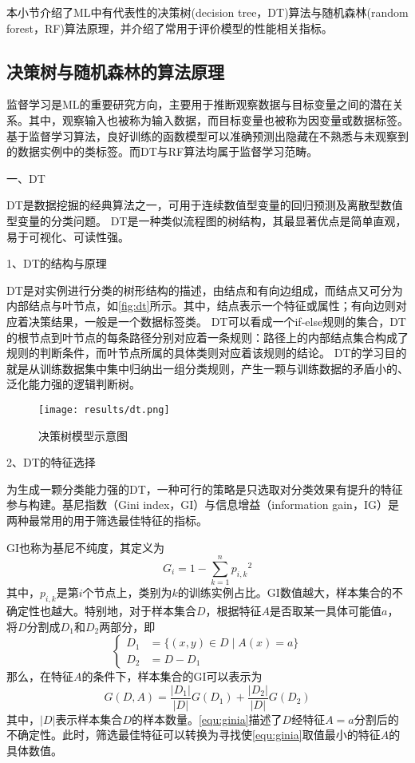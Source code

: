 本小节介绍了ML中有代表性的决策树(decision tree，DT)算法与随机森林(random forest，RF)算法原理，并介绍了常用于评价模型的性能相关指标。

\subsection{决策树与随机森林的算法原理}
监督学习是ML的重要研究方向，主要用于推断观察数据与目标变量之间的潜在关系。其中，观察输入也被称为输入数据，而目标变量也被称为因变量或数据标签。
基于监督学习算法，良好训练的函数模型可以准确预测出隐藏在不熟悉与未观察到的数据实例中的类标签。而DT与RF算法均属于监督学习范畴。

一、DT

DT是数据挖掘的经典算法之一，可用于连续数值型变量的回归预测及离散型数值型变量的分类问题\cite{Li2017,Liu2018}。
DT是一种类似流程图的树结构，其最显著优点是简单直观，易于可视化、可读性强。

1、DT的结构与原理

DT是对实例进行分类的树形结构的描述，由结点和有向边组成，而结点又可分为内部结点与叶节点，如\autoref{fig:dt}所示。其中，结点表示一个特征或属性；有向边则对应着决策结果，一般是一个数据标签类\cite{Li2017,Zhou2016}。
DT可以看成一个if-else规则的集合，DT的根节点到叶节点的每条路径分别对应着一条规则：路径上的内部结点集合构成了规则的判断条件，而叶节点所属的具体类则对应着该规则的结论。
DT的学习目的就是从训练数据集中集中归纳出一组分类规则，产生一颗与训练数据的矛盾小的、泛化能力强的逻辑判断树。
\begin{figure}[htbp]
    \centering
    \texttt{[image: results/dt.png]}
    \caption{\label{fig:dt}决策树模型示意图}
\end{figure}

2、DT的特征选择

为生成一颗分类能力强的DT，一种可行的策略是只选取对分类效果有提升的特征参与构建。基尼指数（Gini index，GI）与信息增益（information gain，IG）是两种最常用的用于筛选最佳特征的指标。

GI也称为基尼不纯度，其定义为
\begin{equation}
    \label{equ:gini}
    G_i = 1 - \sum_{k=1}^n{p_{i,k}}^2
\end{equation}
其中，$p_{i,k}$是第$i$个节点上，类别为$k$的训练实例占比。GI数值越大，样本集合的不确定性也越大。特别地，对于样本集合$D$，根据特征$A$是否取某一具体可能值$a$，将$D$分割成$D_1$和$D_2$两部分，即
\begin{equation}
    \label{equ:daset}
    \left \{
    \begin{aligned}
        D_1 &= \{ (x,y) \in D \mid A(x) = a\} \\
        D_2 &= D - D_1
    \end{aligned}
    \right.
    \end{equation}
那么，在特征$A$的条件下，样本集合的GI可以表示为
\begin{equation}
    \label{equ:ginia}
    G(D,A) = \frac{|D_1|}{|D|}G(D_1) + \frac{|D_2|}{|D|}G(D_2)
\end{equation}
其中，$|D|$表示样本集合$D$的样本数量。\autoref{equ:ginia}描述了$D$经特征$A=a$分割后的不确定性。此时，筛选最佳特征可以转换为寻找使\autoref{equ:ginia}取值最小的特征$A$的具体数值。

